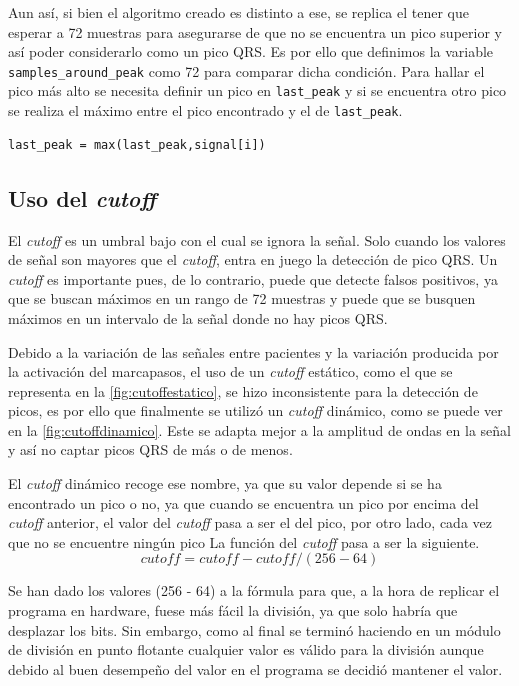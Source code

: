 Aun así, si bien el algoritmo creado es distinto a ese, se replica el tener que esperar a 72 muestras para asegurarse de que no se encuentra un pico superior y así poder considerarlo como un pico QRS. Es por ello que definimos la variable \lstinline|samples_around_peak| como 72 para comparar dicha condición. Para hallar el pico más alto se necesita definir un pico en \lstinline{last_peak} y si se encuentra otro pico se realiza el máximo entre el pico encontrado y el de \lstinline{last_peak}.

\lstset{language=python, breaklines=true, basicstyle=\footnotesize}
\begin{lstlisting}[frame=single]
last_peak = max(last_peak,signal[i])
\end{lstlisting}
\subsection{Uso del \textit{cutoff}}
El \textit{cutoff} es un umbral bajo con el cual se ignora la señal. Solo cuando los valores de señal son mayores que el \textit{cutoff}, entra en juego la detección de pico QRS. Un \textit{cutoff} es importante pues, de lo contrario, puede que detecte falsos positivos, ya que se buscan máximos en un rango de 72 muestras y puede que se busquen máximos en un intervalo de la señal donde no hay picos QRS.

Debido a la variación de las señales entre pacientes y la variación producida por la activación del marcapasos, el uso de un \textit{cutoff} estático, como el que se representa en la \cref{fig:cutoffestatico}, se hizo inconsistente para la detección de picos, es por ello que finalmente se utilizó un \textit{cutoff} dinámico, como se puede ver en la \cref{fig:cutoffdinamico}. Este se adapta mejor a la amplitud de ondas en la señal y así no captar picos QRS de más o de menos.

El \textit{cutoff} dinámico recoge ese nombre, ya que su valor depende si se ha encontrado un pico o no, ya que cuando se encuentra un pico por encima del \textit{cutoff} anterior, el valor del \textit{cutoff} pasa a ser el del pico, por otro lado, cada vez que no se encuentre ningún pico La función del \textit{cutoff} pasa a ser la siguiente.
\[cutoff = cutoff - cutoff/(256 - 64)\]

Se han dado los valores (256 - 64) a la fórmula para que, a la hora de replicar el programa en hardware, fuese más fácil la división, ya que solo habría que desplazar los bits. Sin embargo, como al final se terminó haciendo en un módulo de división en punto flotante cualquier valor es válido para la división aunque debido al buen desempeño del valor en el programa se decidió mantener el valor.

